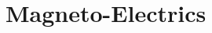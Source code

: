 \clearemptydoublepage
\chapter{Magneto-Electrics}
\label{cha:MagnetoElectrics}


\clearpage

\clearpage

